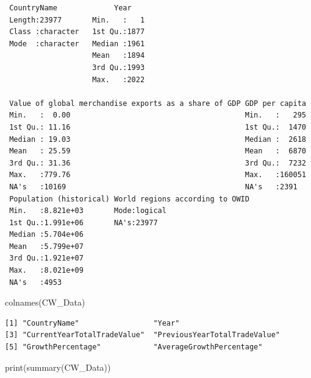 \documentclass[
  10pt,
]{article}
\newenvironment{Shaded}{\begin{snugshade}}{\end{snugshade}}
\newcommand{\FunctionTok}[1]{\textcolor[rgb]{0.28,0.35,0.67}{#1}}
\newcommand{\NormalTok}[1]{\textcolor[rgb]{0.00,0.23,0.31}{#1}}
\begin{document}
\begin{verbatim}
 CountryName             Year     
 Length:23977       Min.   :   1  
 Class :character   1st Qu.:1877  
 Mode  :character   Median :1961  
                    Mean   :1894  
                    3rd Qu.:1993  
                    Max.   :2022  
                                  
 Value of global merchandise exports as a share of GDP GDP per capita  
 Min.   :  0.00                                        Min.   :   295  
 1st Qu.: 11.16                                        1st Qu.:  1470  
 Median : 19.03                                        Median :  2618  
 Mean   : 25.59                                        Mean   :  6870  
 3rd Qu.: 31.36                                        3rd Qu.:  7232  
 Max.   :779.76                                        Max.   :160051  
 NA's   :10169                                         NA's   :2391    
 Population (historical) World regions according to OWID
 Min.   :8.821e+03       Mode:logical                   
 1st Qu.:1.991e+06       NA's:23977                     
 Median :5.704e+06                                      
 Mean   :5.799e+07                                      
 3rd Qu.:1.921e+07                                      
 Max.   :8.021e+09                                      
 NA's   :4953                                           
\end{verbatim}

\begin{Shaded}
\begin{Highlighting}[]
\FunctionTok{colnames}\NormalTok{(CW\_Data)}
\end{Highlighting}
\end{Shaded}

\begin{verbatim}
[1] "CountryName"                 "Year"                       
[3] "CurrentYearTotalTradeValue"  "PreviousYearTotalTradeValue"
[5] "GrowthPercentage"            "AverageGrowthPercentage"    
\end{verbatim}

\begin{Shaded}
\begin{Highlighting}[]
\FunctionTok{print}\NormalTok{(}\FunctionTok{summary}\NormalTok{(CW\_Data))}
\end{Highlighting}
\end{Shaded}
\end{document}
